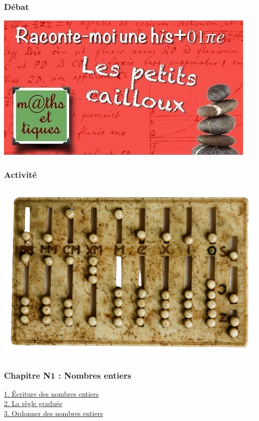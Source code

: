 \documentclass[8pt]{beamer}
\begin{document}
\begin{frame}
\frametitle{\hypertarget{debat}{\textbf{Débat}} \hspace{0pt plus 1 filll} \hyperlink{menu}{\beamerbutton{\faHome}}}
\begin{center}
\href{https://www.youtube-nocookie.com/embed/WRrLnktqUmE?playlist=WRrLnktqUmE&autoplay=1&iv_load_policy=3&loop=1&modestbranding=1&start=}{\includegraphics[scale=0.6]{video.jpg}}
\end{center}
\end{frame}

\begin{frame}
\frametitle{\hypertarget{activite}{\textbf{Activité}} \hspace{0pt plus 1 filll} \hyperlink{menu}{\beamerbutton{\faHome}}}
\begin{center}
\includegraphics[scale=0.8]{abaque.png} 
\end{center}
\end{frame}

\begin{frame}
\frametitle{\hypertarget{cours}{\textbf{Chapitre N1 : Nombres entiers}} \hspace{0pt plus 1 filll} \hyperlink{menu}{\beamerbutton{\faHome}}}
\begin{Large}
\hyperlink{section1}{1. Écriture des nombres entiers} \\
\vspace{5mm}
\hyperlink{section2}{2. La règle graduée} \\
\vspace{5mm}
\hyperlink{section3}{3. Ordonner des nombres entiers}
\end{Large}
\end{frame}
\end{document}
